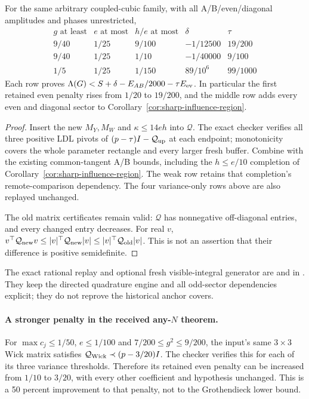 \begin{corollary}
\label{cor:quadratic-all-sector-refinement}
For the same arbitrary coupled-cubic family, with all A/B/even/diagonal
amplitudes and phases unrestricted,
\[
 \begin{array}{c|c|c|c|c}
 g\text{ at least}&e\text{ at most}&h/e\text{ at most}&\delta&\tau\\\hline
 9/40&1/25&9/100&-1/12500&19/200\\
 9/40&1/25&1/10&-1/40000&9/100\\
 1/5&1/25&1/150&89/10^6&99/1000
 \end{array}
\]
Each row proves $\Lambda(G)<S+\delta-E_{AB}/2000-\tau E_{\rm ev}$.
In particular the first retained even penalty rises from $1/20$ to
$19/200$, and the middle row adds every even and diagonal sector to
Corollary~\ref{cor:sharp-influence-region}.
\end{corollary}
\begin{proof}
Insert the new $M_Y,M_W$ and $\kappa\le14eh$ into $\mathcal Q$.
The exact checker verifies all three positive LDL pivots of
$(p-\tau)I-\mathcal Q_{\rm up}$ at each endpoint; monotonicity covers
the whole parameter rectangle and every larger fresh buffer.
Combine with the existing common-tangent A/B bounds, including the
$h\le e/10$ completion of Corollary~\ref{cor:sharp-influence-region}.
The weak row retains that completion's remote-comparison dependency.
The four variance-only rows above are also replayed unchanged.

The old matrix certificates remain valid: $\mathcal Q$ has nonnegative
off-diagonal entries, and every changed entry decreases. For real $v$,
$v^\top\mathcal Q_{\rm new}v\le|v|^\top\mathcal Q_{\rm new}|v|
\le|v|^\top\mathcal Q_{\rm old}|v|$.
This is not an assertion that their difference is positive semidefinite.
\end{proof}
The exact rational replay and optional fresh visible-integral generator
are  and  in
.
They keep the directed quadrature engine and all odd-sector dependencies
explicit; they do not reprove the historical anchor covers.

\paragraph{A stronger penalty in the received any-$N$ theorem.}
For $\max c_j\le1/50$, $e\le1/100$ and
$7/200\le g^2\le9/200$, the input's same $3\times3$ Wick matrix
satisfies $\mathcal Q_{\rm Wick}\prec(p-3/20)I$.
The checker verifies this for each of its three variance thresholds.
Therefore its retained even penalty can be increased from $1/10$
to $3/20$, with every other coefficient and hypothesis unchanged.
This is a 50 percent improvement to that penalty, not to the
Grothendieck lower bound.

